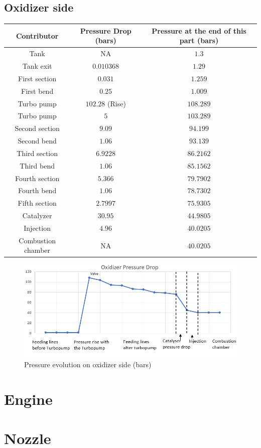 \subsection{Oxidizer side}
\begin{tabular}[H]{|c|c|c|}
	\hline
	\cellcolor{gray!50}Contributor& \cellcolor{gray!50}Pressure Drop (bars) & \cellcolor{gray!50}Pressure at the end of this part (bars)\\
	\hline
	Tank & NA & $1.3$ \\
	\hline
	Tank exit & $0.010368$ & $1.29$\\
	\hline
	First section & $0.031$ &$1.259$\\
	\hline
	First bend &$0.25$ &$1.009$\\
	\hline
	Turbo pump & $102.28 $ (Rise) &$108.289$\\
	\hline
	Turbo pump & $5$ &$103.289$\\
	\hline
	Second section &$9.09$ &$94.199$\\
	\hline
	Second bend &$1.06$ &$93.139$\\
	\hline
	Third section &$6.9228$ &$86.2162$\\
	\hline
	Third bend &$1.06$ &$85.1562$\\
	\hline
	Fourth section &$5.366$ &$79.7902$\\
	\hline
	Fourth bend &$1.06$ &$78.7302$\\
	\hline
	Fifth section &$2.7997$ &$75.9305$\\
	\hline
	Catalyzer &$30.95$ &$44.9805$\\
	\hline
	Injection &$4.96$ &$40.0205$\\
	\hline
	Combustion chamber & NA &$40.0205$\\
	\hline
\end{tabular}

\begin{figure}[H]
	\centering
	\includegraphics[width=\linewidth]{oxchart}
	\caption{Pressure evolution on oxidizer side (bars)}
\end{figure}
\section{Engine}
\section{Nozzle}
